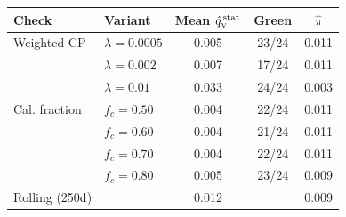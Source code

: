 \begin{tabular}{@{}llccc@{}}
\toprule
Check & Variant & Mean $\hat{q}_{\scriptscriptstyle\mathrm{V}}^{\,\mathrm{stat}}$ & Green & $\hat\pi$ \\
\midrule
		Weighted CP
		& $\lambda=0.0005$ & 0.005 & 23/24 & 0.011 \\
		
		& $\lambda=0.002$ & 0.007 & 17/24 & 0.011 \\
		
		& $\lambda=0.01$ & 0.033 & 24/24 & 0.003 \\
\midrule
		Cal. fraction
		& $f_c=0.50$ & 0.004 & 22/24 & 0.011 \\
		
		& $f_c=0.60$ & 0.004 & 21/24 & 0.011 \\
		
		& $f_c=0.70$ & 0.004 & 22/24 & 0.011 \\
		
		& $f_c=0.80$ & 0.005 & 23/24 & 0.009 \\
\midrule
		Rolling (250d)
		&  & 0.012 &  & 0.009 \\
\bottomrule
\end{tabular}
